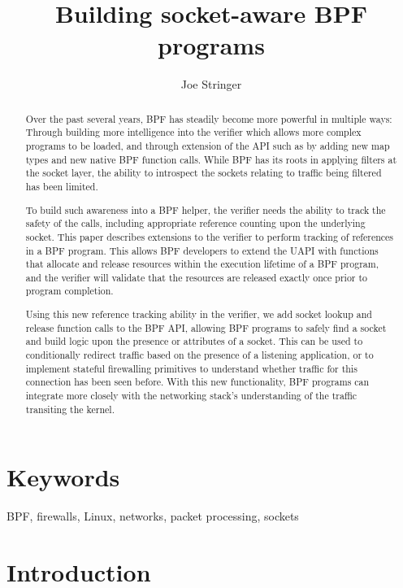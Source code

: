 \documentclass[10pt,sigconf,authorversion]{lpc}
\title{Building socket-aware BPF programs}
\author{Joe Stringer}
\affiliation{%
      \institution{Cilium.io}}
\begin{document}
\begin{abstract}

    Over the past several years, BPF has steadily become more powerful in
    multiple ways: Through building more intelligence into the verifier which
    allows more complex programs to be loaded, and through extension of the API
    such as by adding new map types and new native BPF function calls. While
    BPF has its roots in applying filters at the socket layer, the ability to
    introspect the sockets relating to traffic being filtered has been limited.

    To build such awareness into a BPF helper, the verifier needs the ability
    to track the safety of the calls, including appropriate reference counting
    upon the underlying socket. This paper describes extensions to the verifier
    to perform tracking of references in a BPF program. This allows BPF
    developers to extend the UAPI with functions that allocate and release
    resources within the execution lifetime of a BPF program, and the verifier
    will validate that the resources are released exactly once prior to program
    completion.

    Using this new reference tracking ability in the verifier, we add socket
    lookup and release function calls to the BPF API, allowing BPF programs to
    safely find a socket and build logic upon the presence or attributes of a
    socket. This can be used to conditionally redirect traffic based on the
    presence of a listening application, or to implement stateful firewalling
    primitives to understand whether traffic for this connection has been seen
    before. With this new functionality, BPF programs can integrate more
    closely with the networking stack's understanding of the traffic transiting
    the kernel.

\end{abstract}

\maketitle

\section{Keywords}

BPF, firewalls, Linux, networks, packet processing, sockets

\section{Introduction}
\end{document}
